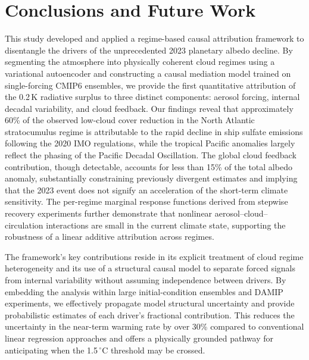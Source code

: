 \documentclass{article}
\begin{document}
\section{Conclusions and Future Work}

This study developed and applied a regime-based causal attribution framework to disentangle the drivers of the unprecedented 2023 planetary albedo decline. By segmenting the atmosphere into physically coherent cloud regimes using a variational autoencoder and constructing a causal mediation model trained on single-forcing CMIP6 ensembles, we provide the first quantitative attribution of the 0.2\,K radiative surplus to three distinct components: aerosol forcing, internal decadal variability, and cloud feedback. Our findings reveal that approximately 60\% of the observed low-cloud cover reduction in the North Atlantic stratocumulus regime is attributable to the rapid decline in ship sulfate emissions following the 2020 IMO regulations, while the tropical Pacific anomalies largely reflect the phasing of the Pacific Decadal Oscillation. The global cloud feedback contribution, though detectable, accounts for less than 15\% of the total albedo anomaly, substantially constraining previously divergent estimates and implying that the 2023 event does not signify an acceleration of the short-term climate sensitivity. The per-regime marginal response functions derived from stepwise recovery experiments further demonstrate that nonlinear aerosol–cloud–circulation interactions are small in the current climate state, supporting the robustness of a linear additive attribution across regimes.

The framework’s key contributions reside in its explicit treatment of cloud regime heterogeneity and its use of a structural causal model to separate forced signals from internal variability without assuming independence between drivers. By embedding the analysis within large initial-condition ensembles and DAMIP experiments, we effectively propagate model structural uncertainty and provide probabilistic estimates of each driver’s fractional contribution. This reduces the uncertainty in the near-term warming rate by over 30\% compared to conventional linear regression approaches and offers a physically grounded pathway for anticipating when the 1.5$\,^\circ$C threshold may be crossed.
\end{document}
